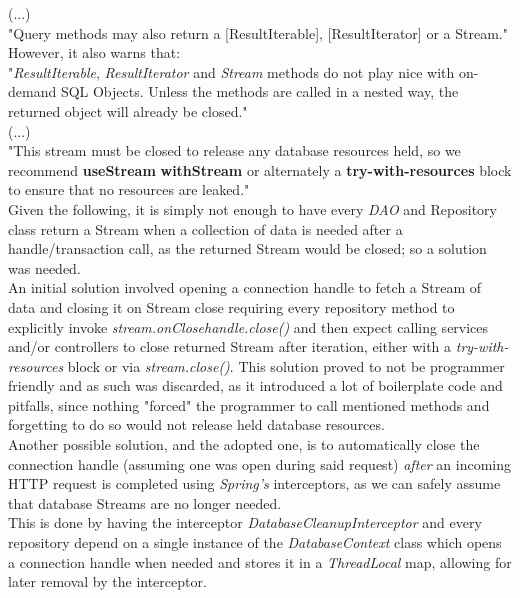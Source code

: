(...)\\

"Query methods may also return a [ResultIterable], [ResultIterator] or a Stream."\\

However, it also warns that:\\

"\textit{ResultIterable}, \textit{ResultIterator} and \textit{Stream} methods do not play nice with on-demand SQL Objects.
Unless the methods are called in a nested way, the returned object will already be closed."\\

(...)\\

"This stream must be closed to release any database resources held, so we recommend \textbf{useStream} \textbf{withStream}
or alternately a \textbf{try-with-resources} block to ensure that no resources are leaked."\\

Given the following, it is simply not enough to have every \textit{DAO} and Repository class return a Stream when a collection
of data is needed after a handle/transaction call, as the returned Stream would be closed; so a solution was needed.\\

An initial solution involved opening a connection handle to fetch a Stream of data and closing it on Stream close requiring every
repository method to explicitly invoke \textit{stream.onClose{handle.close()}} and then expect calling services and/or controllers to close
returned Stream after iteration, either with a \textit{try-with-resources} block or via \textit{stream.close()}. This solution proved to not be programmer
friendly and as such was discarded, as it introduced a lot of boilerplate code and pitfalls, since nothing "forced" the programmer to call mentioned
methods and forgetting to do so would not release held database resources.\\

Another possible solution, and the adopted one, is to automatically close the connection handle (assuming one was open during said request)
\textit{after} an incoming HTTP request is completed using \textit{Spring's} interceptors, as we can safely assume that database Streams are no longer needed.\\

This is done by having the interceptor \textit{DatabaseCleanupInterceptor} and every repository depend on a single instance of the \textit{DatabaseContext} class which opens a
connection handle when needed and stores it in a \textit{ThreadLocal} map, allowing for later removal by the interceptor.\\

